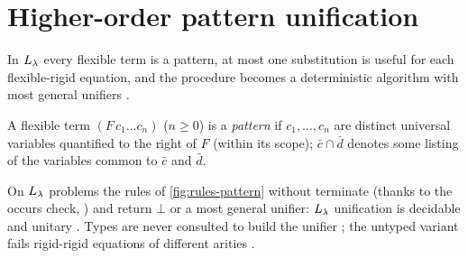 \section{Higher-order pattern unification}\label{sec:rules-pattern}

In $L_\lambda$ every flexible term is a pattern, at most one substitution is useful for each flexible-rigid equation, and the procedure becomes a deterministic algorithm with most general unifiers .

\begin{definition}\label{def:rules-pattern}
A flexible term $(F\,c_1\dots c_n)$ ($n\ge0$) is a \emph{pattern} if $c_1,\dots,c_n$ are distinct universal variables quantified to the right of $F$ (within its scope); $\bar c\cap\bar d$ denotes some listing of the variables common to $\bar c$ and $\bar d$.
\end{definition}

\begin{theorem}[\book{208,221--224}]\label{thm:rules-pattern}
On $L_\lambda$ problems the rules of \cref{fig:rules-pattern} without  terminate (thanks to the occurs check, ) and return $\bot$ or a most general unifier: $L_\lambda$ unification is decidable and unitary \cite{Miller1991}.
Types are never consulted to build the unifier ; the untyped variant fails rigid-rigid equations of different arities \cite[§\,9.3]{Miller1991}.
\end{theorem}

